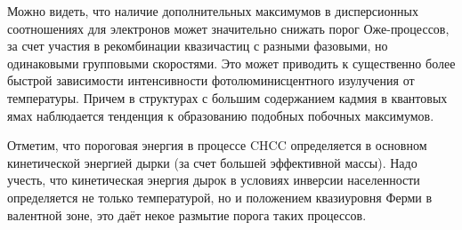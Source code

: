 \documentclass[../main.tex]{subfiles}
\begin{document}
        Можно видеть, что наличие дополнительных максимумов в дисперсионных соотношениях для электронов
        может значительно снижать порог Оже-процессов, за счет участия в рекомбинации квазичастиц с разными фазовыми,
        но одинаковыми групповыми скоростями. Это может приводить к существенно более быстрой зависимости
        интенсивности фотолюминисцентного изулучения от температуры. Причем в структурах с большим содержанием кадмия в квантовых ямах наблюдается тенденция к образованию
        подобных побочных максимумов. 

        Отметим, что пороговая энергия в процессе CHCC определяется в основном кинетической энергией дырки (за счет большей эффективной массы). 
        Надо учесть, что кинетическая
        энергия дырок в условиях инверсии населенности определяется не только температурой, но и положением квазиуровня Ферми в валентной 
        зоне, это даёт некое размытие порога таких процессов.
    \newpage
\end{document}
